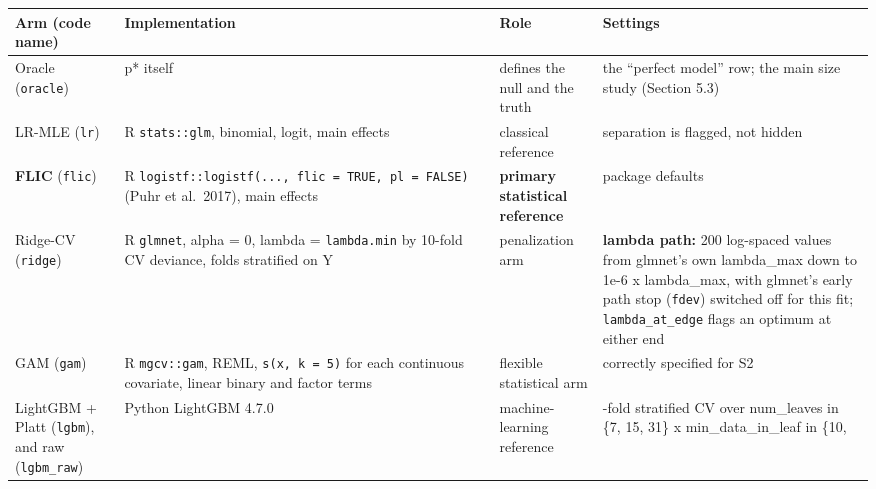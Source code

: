 \documentclass[
  10pt,
]{article}
\newcounter{none} %
\begin{document}
{\def\LTcaptype{none} %
\begin{longtable}[]{@{}
  >{\raggedright\arraybackslash}p{}
  >{\raggedright\arraybackslash}p{}
  >{\raggedright\arraybackslash}p{}
  >{\raggedright\arraybackslash}p{}@{}}
\toprule\noalign{}
\begin{minipage}[b]{\linewidth}\raggedright
Arm (code name)
\end{minipage} & \begin{minipage}[b]{\linewidth}\raggedright
Implementation
\end{minipage} & \begin{minipage}[b]{\linewidth}\raggedright
Role
\end{minipage} & \begin{minipage}[b]{\linewidth}\raggedright
Settings
\end{minipage} \\
\midrule\noalign{}
\endhead
\bottomrule\noalign{}
\endlastfoot
Oracle (\texttt{oracle}) & p* itself & defines the null and
the truth & the ``perfect model'' row; the main size study
(Section 5.3) \\
LR-MLE (\texttt{lr}) & R \texttt{stats::glm}, binomial,
logit, main effects & classical reference & separation is
flagged, not hidden \\
\textbf{FLIC} (\texttt{flic}) & R
\texttt{logistf::logistf(...,\ flic\ =\ TRUE,\ pl\ =\ FALSE)}
(Puhr et al.~2017), main effects & \textbf{primary
statistical reference} & package defaults \\
Ridge-CV (\texttt{ridge}) & R \texttt{glmnet}, alpha = 0,
lambda = \texttt{lambda.min} by 10-fold CV deviance, folds
stratified on Y & penalization arm & \textbf{lambda path:}
200 log-spaced values from glmnet's own lambda\_max down to
1e-6 x lambda\_max, with glmnet's early path stop
(\texttt{fdev}) switched off for this fit;
\texttt{lambda\_at\_edge} flags an optimum at either end \\
GAM (\texttt{gam}) & R \texttt{mgcv::gam}, REML,
\texttt{s(x,\ k\ =\ 5)} for each continuous covariate,
linear binary and factor terms & flexible statistical arm &
correctly specified for S2 \\
LightGBM + Platt (\texttt{lgbm}), and raw
(\texttt{lgbm\_raw}) & Python LightGBM 4.7.0 &
machine-learning reference & 5-fold stratified CV over
num\_leaves in \{7, 15, 31\} x min\_data\_in\_leaf in \{10,

\end{longtable}}
\end{document}

